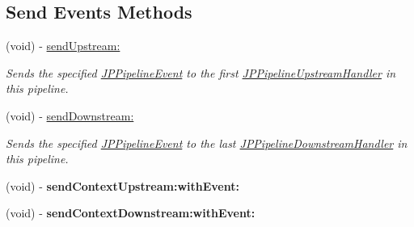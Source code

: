 \subsection*{Send Events Methods}
\begin{DoxyCompactItemize}
\item 
(void) -\/ \hyperlink{a00019_a2de87f8bb472f56d138e2862e88a5227}{sendUpstream:}
\begin{DoxyCompactList}\small\item\em Sends the specified \hyperlink{a00023}{JPPipelineEvent} to the first \hyperlink{a00035}{JPPipelineUpstreamHandler} in this pipeline. \item\end{DoxyCompactList}\item 
(void) -\/ \hyperlink{a00019_afa14dd597bfe8dee4e0621cd4e47a41c}{sendDownstream:}
\begin{DoxyCompactList}\small\item\em Sends the specified \hyperlink{a00023}{JPPipelineEvent} to the last \hyperlink{a00021}{JPPipelineDownstreamHandler} in this pipeline. \item\end{DoxyCompactList}\item 
\hypertarget{a00019_a120641c4888a9315350f2df2f1a93674}{
(void) -\/ {\bfseries sendContextUpstream:withEvent:}}
\label{a00019_a120641c4888a9315350f2df2f1a93674}

\item 
\hypertarget{a00019_a37d6a16b98ac9c7ab3d8d1b054ea2d17}{
(void) -\/ {\bfseries sendContextDownstream:withEvent:}}
\label{a00019_a37d6a16b98ac9c7ab3d8d1b054ea2d17}

\end{DoxyCompactItemize}
